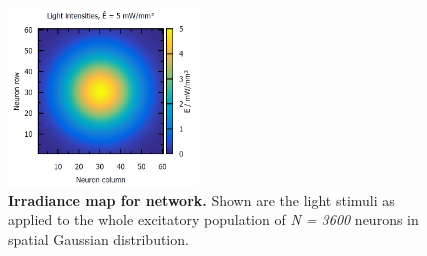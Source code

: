 \documentclass[14pt]{SelfArx} %
\numberwithin{equation}{section}
\begin{document}
\begin{figure} [htp]
\centering
\includegraphics[width = 0.45\textwidth]{irradiancemap.png}
\caption{\textbf{Irradiance map for network.} Shown are the light stimuli as applied to the whole excitatory population of \textit{N = 3600} neurons in  spatial Gaussian distribution.}
\label{fig:irradiancemap}
\end{figure}
\end{document}
